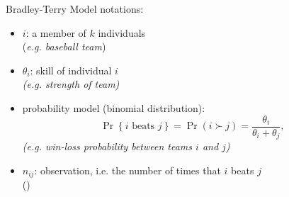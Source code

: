 \documentclass[fleqn,aspectratio=1610]{beamer}
\begin{document}
\begin{frame}[label={sec:orgaea9724}]{Bradley-Terry Model}
notations:
\begin{itemize}
\item \(i\): a member of \(k\) individuals\\[0pt]
(\emph{e.g. baseball team})
\item \(\theta_{i}\): skill of individual \(i\)\\[0pt]
\emph{(e.g. strength of team)}
\item probability model (binomial distribution): 
\begin{equation}
  \Pr\left\{\text{\(i\) beats \(j\)}\right\}
  =\Pr(i\succ j)
  =\frac{\theta_{i}}{\theta_{i}+\theta_{j}},
\end{equation}
\emph{(e.g. win-loss probability between teams \(i\) and \(j\))}
\item \(n_{ij}\): observation,
i.e. the number of times that \(i\) beats \(j\) \\[0pt]
(\cite{BradleyTerry1952})
\end{itemize}
\end{frame}
\end{document}
